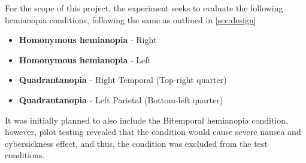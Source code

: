 \documentclass{l4proj}
\begin{document}

 

For the scope of this project, the experiment seeks to evaluate the following hemianopia conditions, following the same as outlined in \ref{sec:design}
\begin{itemize}
    \item \textbf{Homonymous hemianopia} - Right
    \item \textbf{Homonymous hemianopia} - Left
    \item \textbf{Quadrantanopia} - Right Temporal (Top-right quarter)
    \item \textbf{Quadrantanopia} - Left Parietal (Bottom-left quarter)
\end{itemize}

It was initially planned to also include the Bitemporal hemianopia condition, however, pilot testing revealed that the condition would cause severe nausea and cybersickness effect, and thus, the condition was excluded from the test conditions.



\end{document}
